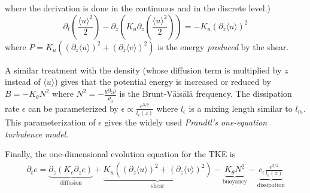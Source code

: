 where the derivation is done in the continuous and in the
discrete level.)
\begin{equation}
	\partial_t \left(\frac{\langle u \rangle^2}{2}\right)
	- \partial_z \left(K_u
	\partial_z\left(\frac{\langle u \rangle^2}{2}\right)\right)
	= - K_u\left(\partial_z \langle u \rangle\right)^2
\end{equation}
where $P=K_u \left(\left(\partial_z \langle u \rangle\right)^2 +
\left(\partial_z \langle v \rangle\right)^2\right)$ is the energy
\textit{produced} by the shear.
\par
A similar treatment with the density
(whose diffusion term is multiplied by $z$ instead of $\langle u \rangle$)
gives that the potential energy
is increased or reduced by $B = -K_\theta N^2$ where
$N^2 = - \frac{g\partial_z \rho}{\rho_0}$ is the Brunt-Väisälä
frequency.
The dissipation rate $\epsilon$ can be parameterized by
$\epsilon \propto \frac{e^{3/2}}{l_{\epsilon}(z)}$
where $l_\epsilon$ is a mixing length similar to $l_m$.
This parameterization of $\epsilon$ gives the widely used
\textit{Prandtl's one-equation turbulence model}.
\par
Finally, the one-dimensional evolution equation for the TKE is
\begin{equation}
\label{eq:airseaSCM_TKE_evolution}
    \begin{aligned}
    \partial_t e =
    \underbrace{\partial_z \left(K_e
    \partial_z e\right)}_{\text{diffusion}}
	    + \underbrace{K_u \left(\left(\partial_z
	    \langle u \rangle\right)^2 +
	    \left(\partial_z \langle v \rangle\right)^2\right)
	    }_{\text{shear}} 
    - \underbrace{K_{\theta} N^2 }_{\text{buoyancy}}
    - \underbrace{c_{\epsilon}
    \frac{e^{3/2}}{l_{\epsilon}(z)}}_{\text{dissipation}}
    \end{aligned}
\end{equation}
